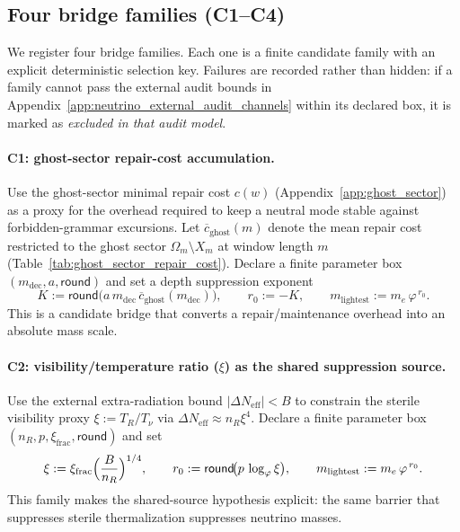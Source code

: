 \subsection{Four bridge families (C1--C4)}
\label{subsec:neutrino_mech_bridge_families}

We register four bridge families. Each one is a finite candidate family with an explicit deterministic selection key.
Failures are recorded rather than hidden: if a family cannot pass the external audit bounds in Appendix~\ref{app:neutrino_external_audit_channels} within its declared box, it is marked as \emph{excluded in that audit model}.

\paragraph{C1: ghost-sector repair-cost accumulation.}
\AuditTag Use the ghost-sector minimal repair cost $c(w)$ (Appendix~\ref{app:ghost_sector}) as a proxy for the overhead required to keep a neutral mode stable against forbidden-grammar excursions.
Let $\overline c_{\mathrm{ghost}}(m)$ denote the mean repair cost restricted to the ghost sector $\Omega_m\setminus X_m$ at window length $m$ (Table~\ref{tab:ghost_sector_repair_cost}).
Declare a finite parameter box $(m_{\mathrm{dec}},a,\mathsf{round})$ and set a depth suppression exponent
\[
K:=\mathsf{round}\!\bigl(a\,m_{\mathrm{dec}}\,\overline c_{\mathrm{ghost}}(m_{\mathrm{dec}})\bigr),
\qquad
r_0:=-K,
\qquad
m_{\mathrm{lightest}}:=m_e\,\varphi^{\,r_0}.
\]
This is a candidate bridge that converts a repair/maintenance overhead into an absolute mass scale.

\paragraph{C2: visibility/temperature ratio (\texorpdfstring{$\xi$}{xi}) as the shared suppression source.}
\AuditTag Use the external extra-radiation bound $|\Delta N_\mathrm{eff}|<B$ to constrain the sterile visibility proxy $\xi:=T_R/T_\nu$ via $\Delta N_\mathrm{eff}\approx n_R\xi^4$.
Declare a finite parameter box $(n_R,p,\xi_{\mathrm{frac}},\mathsf{round})$ and set
\[
\xi:=\xi_{\mathrm{frac}}\Bigl(\frac{B}{n_R}\Bigr)^{1/4},
\qquad
r_0:=\mathsf{round}\!\bigl(p\,\log_\varphi \xi\bigr),
\qquad
m_{\mathrm{lightest}}:=m_e\,\varphi^{\,r_0}.
\]
This family makes the shared-source hypothesis explicit: the same barrier that suppresses sterile thermalization suppresses neutrino masses.

